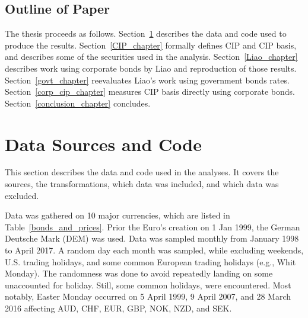 \subsection{Outline of Paper}

The thesis proceeds as follows.  Section~\ref{data_chapter} describes the data and code used to produce the results.  Section~\ref{CIP_chapter} formally defines CIP and CIP basis, and describes some of the securities used in the analysis.  Section~\ref{Liao_chapter} describes work using corporate bonds by Liao and reproduction of those results.  Section~\ref{govt_chapter} reevaluates Liao's work using government bonds rates.  Section~\ref{corp_cip_chapter} measures CIP basis directly using corporate bonds.  Section~\ref{conclusion_chapter} concludes.  

\section{Data Sources and Code} \label{data_chapter}

This section describes the data and code used in the analyses.  It covers the sources, the transformations, which data was included, and which data was excluded.  



Data was gathered on 10 major currencies, which are listed in Table~\ref{bonds_and_prices}.  Prior the Euro's creation on 1 Jan 1999, the German Deutsche Mark (DEM) was used.  Data was sampled monthly from January 1998 to April 2017.  A random day each month was sampled, while excluding weekends, U.S. trading holidays, and some common European trading holidays (e.g., Whit Monday).  The randomness was done to avoid repeatedly landing on some unaccounted for holiday.  Still, some common holidays, were encountered.  Most notably, Easter Monday occurred on 5 April 1999, 9 April 2007, and 28 March 2016 affecting AUD, CHF, EUR, GBP, NOK, NZD, and SEK.  


